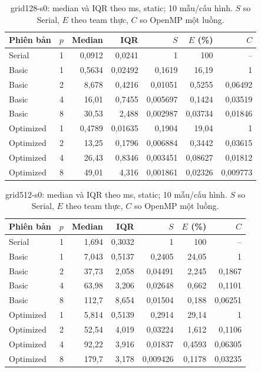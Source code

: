 \begin{table}[htbp]
\centering\small
\caption[grid128-s0: thống kê static]{grid128-s0: median và IQR theo ms, static; 10 mẫu/cấu hình. $S$ so Serial, $E$ theo team thực, $C$ so OpenMP một luồng.}
\label{tab:grid128-s0}
\begin{tabular}{lrrrrrr}
\toprule
Phiên bản & $p$ & Median & IQR & $S$ & $E$ (\%) & $C$ \\
\midrule
Serial & 1 & 0,0912 & 0,0241 & 1 & 100 & -- \\
Basic & 1 & 0,5634 & 0,02492 & 0,1619 & 16,19 & 1 \\
Basic & 2 & 8,678 & 0,4216 & 0,01051 & 0,5255 & 0,06492 \\
Basic & 4 & 16,01 & 0,7455 & 0,005697 & 0,1424 & 0,03519 \\
Basic & 8 & 30,53 & 2,488 & 0,002987 & 0,03734 & 0,01846 \\
Optimized & 1 & 0,4789 & 0,01635 & 0,1904 & 19,04 & 1 \\
Optimized & 2 & 13,25 & 0,1796 & 0,006884 & 0,3442 & 0,03615 \\
Optimized & 4 & 26,43 & 0,8346 & 0,003451 & 0,08627 & 0,01812 \\
Optimized & 8 & 49,01 & 4,316 & 0,001861 & 0,02326 & 0,009773 \\
\bottomrule
\end{tabular}
\end{table}

\begin{table}[htbp]
\centering\small
\caption[grid512-s0: thống kê static]{grid512-s0: median và IQR theo ms, static; 10 mẫu/cấu hình. $S$ so Serial, $E$ theo team thực, $C$ so OpenMP một luồng.}
\label{tab:grid512-s0}
\begin{tabular}{lrrrrrr}
\toprule
Phiên bản & $p$ & Median & IQR & $S$ & $E$ (\%) & $C$ \\
\midrule
Serial & 1 & 1,694 & 0,3032 & 1 & 100 & -- \\
Basic & 1 & 7,043 & 0,5137 & 0,2405 & 24,05 & 1 \\
Basic & 2 & 37,73 & 2,058 & 0,04491 & 2,245 & 0,1867 \\
Basic & 4 & 63,98 & 3,206 & 0,02648 & 0,662 & 0,1101 \\
Basic & 8 & 112,7 & 8,654 & 0,01504 & 0,188 & 0,06251 \\
Optimized & 1 & 5,814 & 0,5139 & 0,2914 & 29,14 & 1 \\
Optimized & 2 & 52,54 & 4,019 & 0,03224 & 1,612 & 0,1106 \\
Optimized & 4 & 92,22 & 3,916 & 0,01837 & 0,4593 & 0,06305 \\
Optimized & 8 & 179,7 & 3,178 & 0,009426 & 0,1178 & 0,03235 \\
\bottomrule
\end{tabular}
\end{table}

